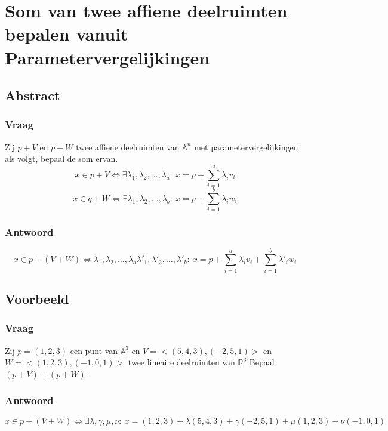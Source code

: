 \documentclass[main.tex]{subfiles}
\begin{document}
\newpage
\section{Som van twee affiene deelruimten bepalen vanuit Parametervergelijkingen}
\subsection*{Abstract}
\subsubsection*{Vraag}
\begin{center}
  Zij $p+V$ en $p+W$ twee affiene deelruimten van $\mathbb{A}^{n}$ met parametervergelijkingen als volgt, bepaal de som ervan.
  \[ x\in p+V \Leftrightarrow \exists \lambda_{1},\lambda_{2},\dotsc,\lambda_{a}:\ x = p + \sum_{i=1}^{a}\lambda_{i}v_{i} \]
  \[ x\in q+W \Leftrightarrow \exists \lambda_{1},\lambda_{2},\dotsc,\lambda_{b}:\ x = p + \sum_{i=1}^{b}\lambda_{i}w_{i} \]
\end{center}

\subsubsection*{Antwoord}
\[ x \in p+(V+W)  \Leftrightarrow \lambda_{1},\lambda_{2},\dotsc,\lambda_{a}\lambda'_{1},\lambda'_{2},\dotsc,\lambda'_{b}:\ x = p + \sum_{i=1}^{a}\lambda_{i}v_{i}+ \sum_{i=1}^{b}\lambda'_{i}w_{i}\]

\subsection*{Voorbeeld}
\subsubsection*{Vraag}
\begin{center}
  Zij $p=(1,2,3)$ een punt van $\mathbb{A}^{3}$ en $V=<(5,4,3),(-2,5,1)>$ en $W=<(1,2,3),(-1,0,1)>$ twee lineaire deelruimten van $\mathbb{R}^{3}$
  Bepaal $(p+V) + (p+W)$.
\end{center}

\subsubsection*{Antwoord}
\[
x\in p+(V+W) \Leftrightarrow \exists \lambda, \gamma, \mu, \nu:\ 
x = (1,2,3) + \lambda (5,4,3) + \gamma (-2,5,1) + \mu (1,2,3) + \nu (-1,0,1)
\]
\end{document}
